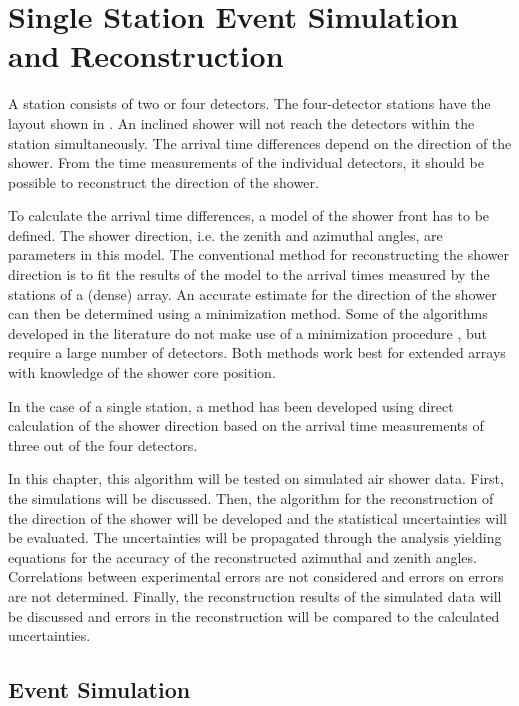 \chapter{Single Station Event Simulation and Reconstruction}
\label{ch:reconstruction}

A \hisparc station consists of two or four detectors. The four-detector stations
have the layout shown in .  An
inclined shower will not reach the detectors within the station simultaneously.
The arrival time differences depend
on the direction of the shower.  From the time measurements of the individual
detectors, it should be possible to reconstruct the direction of the shower.

To calculate the arrival time differences, a model of the shower front has to be
defined.  The shower direction, i.e. the zenith and azimuthal angles, are
parameters in this model.  The conventional method for reconstructing the
shower direction is to fit the results of the model to the arrival times
measured by the stations of a (dense) array.  An accurate estimate for the
direction of the shower can then be determined using a minimization method.
Some of the algorithms developed in the literature do not make use of a
minimization procedure \cite{Mayer:1993}, but require a large number of
detectors.  Both methods work best for extended arrays with knowledge of the
shower core position.

In the case of a single \hisparc station, a method has been developed using
direct calculation of the shower direction based on the arrival time
measurements of three out of the four detectors.

In this chapter, this algorithm will be tested on simulated air shower data.
First, the simulations will be discussed.  Then, the algorithm for the
reconstruction of the direction of the shower will be developed and the
statistical uncertainties will be evaluated.  The uncertainties will be
propagated through the analysis yielding equations for the accuracy of the
reconstructed azimuthal and zenith angles.  Correlations between
experimental errors are not considered and errors on errors are not
determined.  Finally, the reconstruction results of the simulated data
will be discussed and errors in the reconstruction will be compared to the
calculated uncertainties.


\section{Event Simulation}

